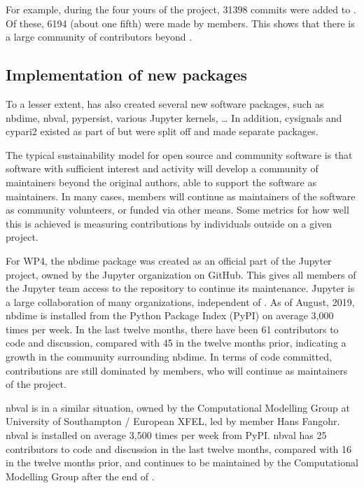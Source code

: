 \documentclass{deliverablereport}
\begin{document}
For example, during the four yours of the \ODK project,
31398 commits were added to \Sage.
Of these, 6194
(about one fifth)  %
were made by \ODK members.
This shows that there is a large community of contributors beyond \ODK.

\subsection{Implementation of new packages}

To a lesser extent,
\ODK has also created several new software packages,
such as nbdime, nbval, pypersist, various Jupyter kernels, \ldots
In addition, cysignals and cypari2 existed as part of \Sage but were split
off and made separate packages.

The typical sustainability model for open source and community software
is that software with sufficient interest and activity will develop
a community of maintainers beyond the original authors,
able to support the software as maintainers.
In many cases, \ODK members will continue as maintainers of the software
as community volunteers, or funded via other means.
Some metrics for how well this is achieved is measuring contributions
by individuals outside \ODK on a given project.

For WP4, the nbdime package was created as an official part of the Jupyter project,
owned by the Jupyter organization on GitHub.
This gives all members of the Jupyter team access to the repository to continue its maintenance.
Jupyter is a large collaboration of many organizations, independent of \ODK.
As of August, 2019, nbdime is installed from the Python Package Index (PyPI) on average 3,000 times per week.
In the last twelve months, there have been 61 contributors to code and discussion, compared with 45 in the twelve months prior,
indicating a growth in the community surrounding nbdime.
In terms of code committed, contributions are still dominated by \ODK members,
who will continue as maintainers of the project.

nbval is in a similar situation,
owned by the Computational Modelling Group at University of Southampton / European XFEL,
led by \ODK member Hans Fangohr.
nbval is installed on average 3,500 times per week from PyPI.
nbval has 25 contributors to code and discussion in the last twelve months,
compared with 16 in the twelve months prior,
and continues to be maintained by the Computational Modelling Group after the end of \ODK.
\end{document}
